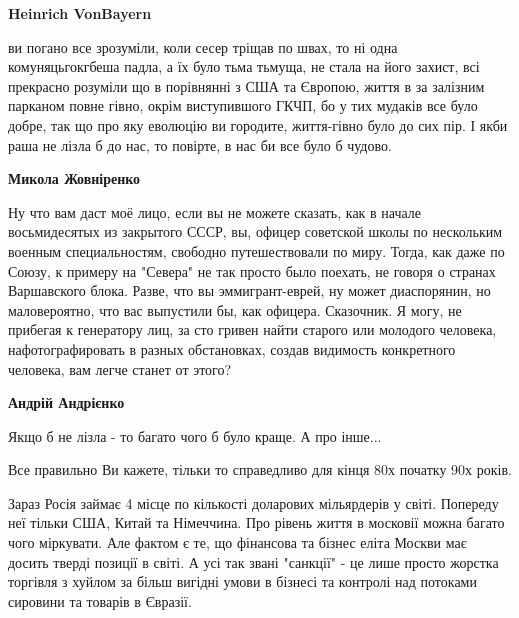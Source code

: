 \begin{itemize}
\begin{itemize}
\textbf{Heinrich VonBayern} 

ви погано все зрозуміли, коли сесер тріщав по
швах, то ні одна комуняцьгокгбеша падла, а їх було тьма тьмуща, не стала на його
захист, всі прекрасно розуміли що в порівнянні з США та Європою, життя в за
залізним парканом повне гівно, окрім виступившого ГКЧП, бо у тих мудаків все було
добре, так що про яку еволюцію ви городите, життя-гівно було до сих пір. І якби
раша не лізла б до нас, то повірте, в нас би все було б чудово.

 
\textbf{Микола Жовніренко} 

Ну что вам даст моё лицо, если вы не можете сказать,
как в начале восьмидесятых из закрытого СССР, вы, офицер советской школы по
нескольким военным специальностям, свободно путешествовали по миру. Тогда, как
даже по Союзу, к примеру на "Севера" не так просто было поехать, не говоря о
странах Варшавского блока. Разве, что вы эммигрант-еврей, ну может диаспорянин,
но маловероятно, что вас выпустили бы, как офицера. Сказочник. Я могу, не
прибегая к генератору лиц, за сто гривен найти старого или молодого человека,
нафотографировать в разных обстановках, создав видимость конкретного человека,
вам легче станет от этого?

 
\textbf{Андрій Андрієнко}

Якщо б не лізла - то багато чого б було краще. А про інше...

Все правильно Ви кажете, тільки то справедливо для кінця 80х початку 90х років.

Зараз Росія займає 4 місце по кількості доларових мільярдерів у світі. Попереду
неї тільки США, Китай та Німеччина. Про рівень життя в московії можна багато
чого міркувати. Але фактом є те, що фінансова та бізнес еліта Москви має досить
тверді позиції в світі. А усі так звані "санкції" - це лише просто жорстка
торгівля з хуйлом за більш вигідні умови в бізнесі та контролі над потоками
сировини та товарів в Євразії.



\end{itemize}
\end{itemize}

